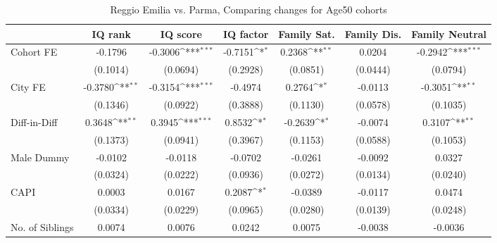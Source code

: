 \begin{table}[htbp]\centering
\def\sym#1{\ifmmode^{#1}\else\(^{#1}\)\fi}
\caption{Reggio Emilia vs. Parma, Comparing changes for Age50 cohorts}
\begin{tabular}{l*{6}{c}}
\toprule
            &\multicolumn{1}{c}{IQ rank}&\multicolumn{1}{c}{IQ score}&\multicolumn{1}{c}{IQ factor}&\multicolumn{1}{c}{Family Sat.}&\multicolumn{1}{c}{Family Dis.}&\multicolumn{1}{c}{Family Neutral}\\
\midrule
Cohort FE   &     -0.1796         &     -0.3006\sym{***}&     -0.7151\sym{*}  &      0.2368\sym{**} &      0.0204         &     -0.2942\sym{***}\\
            &    (0.1014)         &    (0.0694)         &    (0.2928)         &    (0.0851)         &    (0.0444)         &    (0.0794)         \\
\addlinespace
City FE     &     -0.3780\sym{**} &     -0.3154\sym{***}&     -0.4974         &      0.2764\sym{*}  &     -0.0113         &     -0.3051\sym{**} \\
            &    (0.1346)         &    (0.0922)         &    (0.3888)         &    (0.1130)         &    (0.0578)         &    (0.1035)         \\
\addlinespace
Diff-in-Diff&      0.3648\sym{**} &      0.3945\sym{***}&      0.8532\sym{*}  &     -0.2639\sym{*}  &     -0.0074         &      0.3107\sym{**} \\
            &    (0.1373)         &    (0.0941)         &    (0.3967)         &    (0.1153)         &    (0.0588)         &    (0.1053)         \\
\addlinespace
Male Dummy  &     -0.0102         &     -0.0118         &     -0.0702         &     -0.0261         &     -0.0092         &      0.0327         \\
            &    (0.0324)         &    (0.0222)         &    (0.0936)         &    (0.0272)         &    (0.0134)         &    (0.0240)         \\
\addlinespace
CAPI        &      0.0003         &      0.0167         &      0.2087\sym{*}  &     -0.0389         &     -0.0117         &      0.0474         \\
            &    (0.0334)         &    (0.0229)         &    (0.0965)         &    (0.0280)         &    (0.0139)         &    (0.0248)         \\
\addlinespace
No. of Siblings&      0.0074         &      0.0076         &      0.0242         &      0.0075         &     -0.0038         &     -0.0036         \\

\end{tabular}
\end{table}
